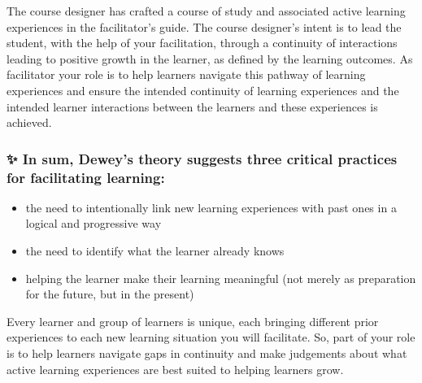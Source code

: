 \documentclass[
]{book}
\providecommand{\tightlist}{%
  \setlength{\itemsep}{0pt}\setlength{\parskip}{0pt}}
\begin{document}
The course designer has crafted a course of study and associated active learning experiences in the facilitator's guide. The course designer's intent is to lead the student, with the help of your facilitation, through a continuity of interactions leading to positive growth in the learner, as defined by the learning outcomes. As facilitator your role is to help learners navigate this pathway of learning experiences and ensure the intended continuity of learning experiences and the intended learner interactions between the learners and these experiences is achieved.

\begin{blank}
\hypertarget{in-sum-deweys-theory-suggests-three-critical-practices-for-facilitating-learning}{%
\subsubsection{✨ In sum, Dewey's theory suggests three critical practices for facilitating learning:}\label{in-sum-deweys-theory-suggests-three-critical-practices-for-facilitating-learning}}

\begin{itemize}
\tightlist
\item
  the need to intentionally link new learning experiences with past ones in a logical and progressive way\\
\item
  the need to identify what the learner already knows\\
\item
  helping the learner make their learning meaningful (not merely as preparation for the future, but in the present)
\end{itemize}
\end{blank}

Every learner and group of learners is unique, each bringing different prior experiences to each new learning situation you will facilitate. So, part of your role is to help learners navigate gaps in continuity and make judgements about what active learning experiences are best suited to helping learners grow.
\end{document}
